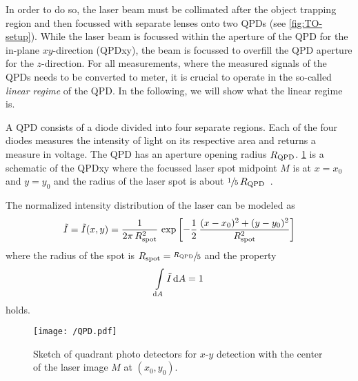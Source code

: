 In order to do so, the laser beam must be collimated after the object trapping 
region and then focussed with separate lenses onto two QPDs (see 
\cref{fig:TO-setup}). While the laser beam is focussed within the aperture of 
the QPD for the in-plane $xy$-direction (QPDxy), the beam is focussed to 
overfill the QPD aperture for the $z$-direction. For all measurements, where 
the measured signals of the QPDs needs to be converted to meter, it is crucial 
to operate in the so-called \emph{linear regime} of the QPD. In the following, 
we will show what the linear regime is.

A QPD consists of a diode divided into four separate regions. Each of the four 
diodes measures the intensity of light on its respective area and returns a 
measure in voltage. The QPD has an aperture opening radius $R_{\mathrm{QPD}}$. 
\cref{fig:TO-QPD} is a schematic of the QPDxy where the focussed laser spot 
midpoint $M$ is at $x=x_{0}$ and $y=y_{0}$ and the radius of the laser spot is 
about $\sfrac{1}{5}\,R_{\mathrm{QPD}}$~\cite{Lamprecht2017}.

The normalized intensity distribution of the laser can be modeled as
\begin{equation}
  \tilde{I} = \tilde{I}(x, y) = 
  \frac{1}{2\pi\,R_{\mathrm{spot}}^{2}}\,\exp\left[ 
  -\frac{1}{2}\,\frac{(x-x_{0})^{2} + (y - y_{0})^{2}}{R_{\mathrm{spot}}^{2}} 
\right]
    \label{eq:TO-intensity}
\end{equation}
where the radius of the spot is $R_{\mathrm{spot}}=\sfrac{R_{\mathrm{QPD}}}{5}$ and the property 
\begin{equation}
  \int\limits_{\dd{A}}\tilde{I}\dd{A} = 1
\end{equation}
holds.

\begin{figure}[tbp]
  \centering
  \texttt{[image: /QPD.pdf]}
  \caption{Sketch of quadrant photo detectors for $x$-$y$ detection with the 
  center of the laser image $M$ at $(x_{0}, y_{0})$.}
  \label{fig:TO-QPD}
\end{figure}

